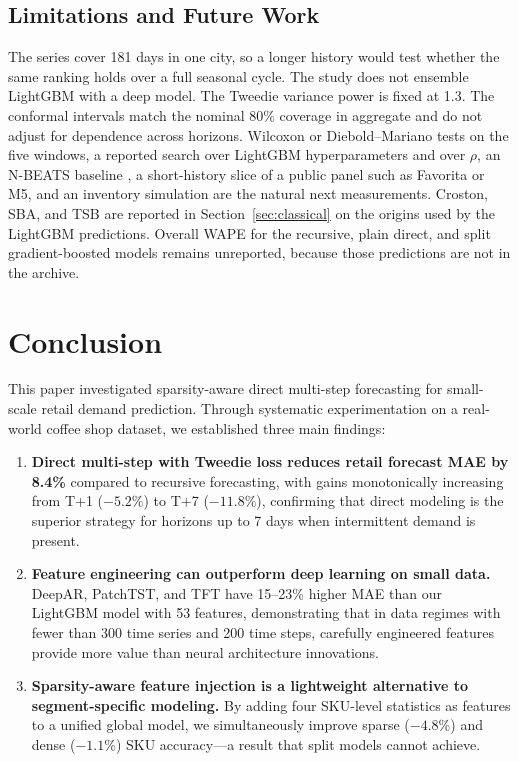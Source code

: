 \documentclass[review,authoryear]{elsarticle}
\begin{document}
\subsection{Limitations and Future Work}

The series cover 181 days in one city, so a longer history would test whether the same ranking holds over a full seasonal cycle. The study does not ensemble LightGBM with a deep model. The Tweedie variance power is fixed at 1.3. The conformal intervals match the nominal 80\% coverage in aggregate and do not adjust for dependence across horizons. Wilcoxon or Diebold--Mariano tests on the five windows, a reported search over LightGBM hyperparameters and over $\rho$, an N-BEATS baseline \citep{oreshkin2020nbeats}, a short-history slice of a public panel such as Favorita or M5, and an inventory simulation are the natural next measurements. Croston, SBA, and TSB are reported in Section~\ref{sec:classical} on the origins used by the LightGBM predictions. Overall WAPE for the recursive, plain direct, and split gradient-boosted models remains unreported, because those predictions are not in the archive.

\section{Conclusion}

This paper investigated sparsity-aware direct multi-step forecasting for small-scale retail demand prediction. Through systematic experimentation on a real-world coffee shop dataset, we established three main findings:

\begin{enumerate}
    \item \textbf{Direct multi-step with Tweedie loss reduces retail forecast MAE by 8.4\%} compared to recursive forecasting, with gains monotonically increasing from T+1 ($-5.2\%$) to T+7 ($-11.8\%$), confirming that direct modeling is the superior strategy for horizons up to 7 days when intermittent demand is present.
    \item \textbf{Feature engineering can outperform deep learning on small data.} DeepAR, PatchTST, and TFT have 15--23\% higher MAE than our LightGBM model with 53 features, demonstrating that in data regimes with fewer than 300 time series and 200 time steps, carefully engineered features provide more value than neural architecture innovations.
    \item \textbf{Sparsity-aware feature injection is a lightweight alternative to segment-specific modeling.} By adding four SKU-level statistics as features to a unified global model, we simultaneously improve sparse ($-4.8$\%) and dense ($-1.1$\%) SKU accuracy---a result that split models cannot achieve.
\end{enumerate}
\end{document}
